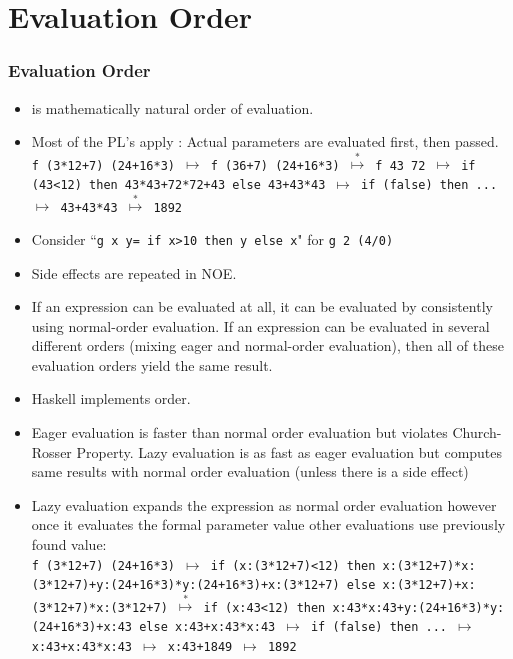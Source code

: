 \section{Evaluation Order}
\begin{frame}
\frametitle{Evaluation Order}
\begin{itemize}
\item {} is mathematically natural order of evaluation.
\item Most of the PL's apply : Actual parameters are evaluated
first, then passed.\\
\texttt{\scriptsize f (3*12+7) (24+16*3) $\mapsto$
	f (36+7) (24+16*3) $\stackrel{*}{\mapsto}$
	f 43 72 $\mapsto$  if (43<12) then 43*43+72*72+43 
                  else 43+43*43 $\mapsto$ if (false) then ... $\mapsto$
	43+43*43 $\stackrel{*}{\mapsto}$ 1892}\hfill {}
\item Consider ``\lstinline!g x y= if x>10 then y else x!"  for \texttt{g 2 (4/0)}
\item Side effects are repeated in NOE.
\item {} {\small\rm
If an expression can be evaluated at all, it can be evaluated by consistently using
normal-order evaluation. If an expression can be evaluated in several different orders
(mixing eager and normal-order evaluation), then all of these evaluation orders yield
the same result.}
\end{itemize}
\end{frame}

\begin{frame}
\begin{itemize}
\item Haskell implements  order.
\item Eager evaluation is faster than normal order evaluation but violates Church-Rosser
Property. Lazy evaluation is as fast as eager evaluation but computes same results with normal
order evaluation (unless there is a side effect)
\item Lazy evaluation expands the expression as normal order evaluation however once it
evaluates the formal parameter value other evaluations use previously found value:\\
\texttt{\scriptsize f (3*12+7) (24+16*3) $\mapsto$
	  if (x:(3*12+7)<12) then x:(3*12+7)*x:(3*12+7)+y:(24+16*3)*y:(24+16*3)+x:(3*12+7) 
                  else x:(3*12+7)+x:(3*12+7)*x:(3*12+7) $\stackrel{*}{\mapsto}$
	if (x:43<12) then x:43*x:43+y:(24+16*3)*y:(24+16*3)+x:43
                  else x:43+x:43*x:43 $\mapsto$ if (false) then ... $\mapsto$ x:43+x:43*x:43
	$\mapsto$ x:43+1849 $\mapsto$ 1892}\hfill {}
	

\end{itemize}
\end{frame}

